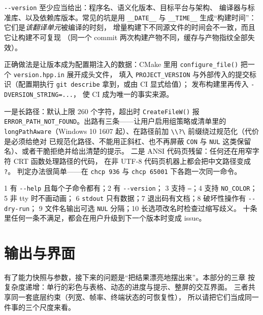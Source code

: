 \documentclass[12pt,a4paper,fontset=fandol]{ctexbook}
\newcommand{\Fn}[1]{\texttt{#1()}}
\newcommand{\Tp}[1]{\texttt{#1}}
\newcommand{\Opt}[1]{\texttt{-\/-#1}}
\newcommand{\Bk}{\allowbreak}
\begin{document}
\Opt{version} 至少应当给出：程序名、语义化版本、目标平台与架构、
编译器与标准库、以及依赖库版本。常见的坑是用 \Tp{\_\_DATE\_\_} 与
\Tp{\_\_TIME\_\_} 生成``构建时间''：它们是\emph{该翻译单元}被编译的时刻，
增量构建下不同源文件的时间会不一致，而且它让构建不可复现
（同一个 commit 两次构建产物不同，缓存与产物指纹全部失效）。

正确做法是让版本成为配置期注入的数据：CMake 里用
\Fn{configure\_file} 把一个 \Tp{version.hpp.in} 展开成头文件，
填入 \Tp{PROJECT\_VERSION} 与外部传入的提交标识（配置期执行
\Tp{git describe} 拿到，或由 CI 显式给值）；
发布构建里再传入 \Tp{-DVERSION\_STRING=...}，
使 CI 成为唯一的事实来源。

\begin{note}[title={Windows 的两个遗留坑}]
一是长路径：默认上限 260 个字符，超出时 \Fn{CreateFileW} 报
\Tp{ERROR\_{\Bk}PATH\_{\Bk}NOT\_{\Bk}FOUND}。出路有三条——让用户启用组策略或清单里的
\Tp{long{\Bk}Path{\Bk}Aware}（Windows 10 1607 起）、在路径前加
\Tp{\textbackslash\textbackslash?\textbackslash{}} 前缀绕过规范化（代价是必须给绝对
已规范化路径、不能用正斜杠、也不再屏蔽 \Tp{CON} 与 \Tp{NUL}
这类保留名）、或者干脆拒绝并给出清楚的提示。
二是 ANSI 代码页残留：任何还在用窄字符 CRT 函数处理路径的代码，
在非 UTF-8 代码页机器上都会把中文路径变成 \Tp{?}。
判定办法很简单——在 \Tp{chcp 936} 与 \Tp{chcp 65001} 下各跑一次同一命令。
\end{note}

\begin{bestpractice}[title={发布前用这十条自查}]
1 有 \Opt{help} 且每个子命令都有；2 有 \Opt{version}；
3 支持 \Tp{--}；4 支持 \Tp{NO\_COLOR}；5 非 tty 时不画动画；
6 \Tp{stdout} 只有数据；7 退出码有文档；8 破坏性操作有 \Opt{dry-run}；
9 文件名输出可选 \Tp{NUL} 分隔；10 长选项改名时检查过缩写歧义。
十条里任何一条不满足，都会在用户升级到下一个版本时变成 issue。
\end{bestpractice}

\part{输出与界面}

有了能力快照与参数，接下来的问题是``把结果漂亮地摆出来''。本部分的三章
按复杂度递增：单行的彩色与表格、动态的进度与提示、整屏的交互界面。
三者共享同一套底层约束（列宽、帧率、终端状态的可恢复性），
所以请把它们当成同一件事的三个尺度来看。

\end{document}
